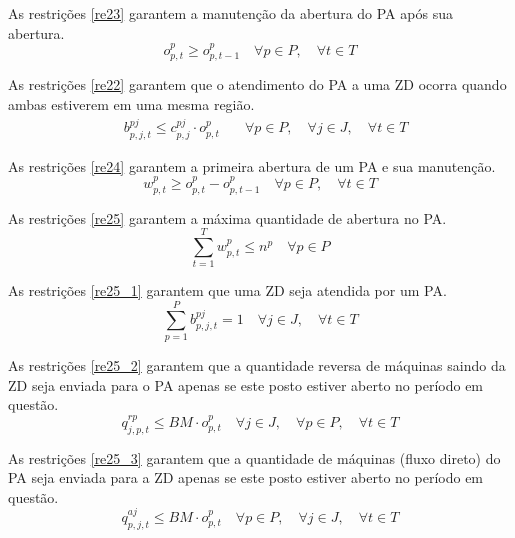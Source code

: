 As restrições \ref{re23} garantem a manutenção da abertura do PA após sua abertura.
\begin{equation}\label{re23}
o^{p}_{p,t} \geq o^{p}_{p, t-1} \quad \forall p \in P, \quad \forall t \in T
\end{equation}

As restrições \ref{re22} garantem que o atendimento do PA a uma ZD ocorra quando ambas estiverem em uma mesma região.
\begin{equation}\label{re22}
\begin{aligned}
& b^{pj}_{p,j,t} \leq c^{pj}_{p,j} \cdot o^{p}_{p,t}
\quad & \forall p \in P, \quad \forall j \in J, \quad \forall t \in T
\end{aligned}
\end{equation}

As restrições \ref{re24} garantem a primeira abertura de um PA e sua manutenção.
\begin{equation}\label{re24}
w^{p}_{p,t} \geq o^{p}_{p,t} - o^{p}_{p,t-1} \quad \forall p \in P, \quad \forall t \in T
\end{equation}

As restrições \ref{re25} garantem a máxima quantidade de abertura no PA.
\begin{equation}\label{re25}
\sum_{t=1}^{T} w^{p}_{p, t} \leq n^{p} \quad \forall p \in P
\end{equation}

As restrições \ref{re25_1} garantem que uma ZD seja atendida por um PA.
\begin{equation}\label{re25_1}
\sum_{p=1}^{P} b^{pj}_{p,j,t} = 1 \quad \forall j \in J, \quad \forall t \in T
\end{equation}

As restrições \ref{re25_2} garantem que a quantidade reversa de máquinas saindo da ZD seja enviada para o PA apenas se este posto estiver aberto no período em questão.
\begin{equation}\label{re25_2}
q^{rp}_{j,p,t} \leq BM \cdot o^{p}_{p,t} \quad \forall j \in J, \quad \forall p \in P, \quad \forall t \in T
\end{equation}

As restrições \ref{re25_3} garantem que a quantidade de máquinas (fluxo direto) do PA seja enviada para a ZD apenas se este posto estiver aberto no período em questão.
\begin{equation}\label{re25_3}
q^{aj}_{p,j,t} \leq BM \cdot o^{p}_{p,t} \quad \forall p \in P, \quad \forall j \in J, \quad \forall t \in T
\end{equation}


